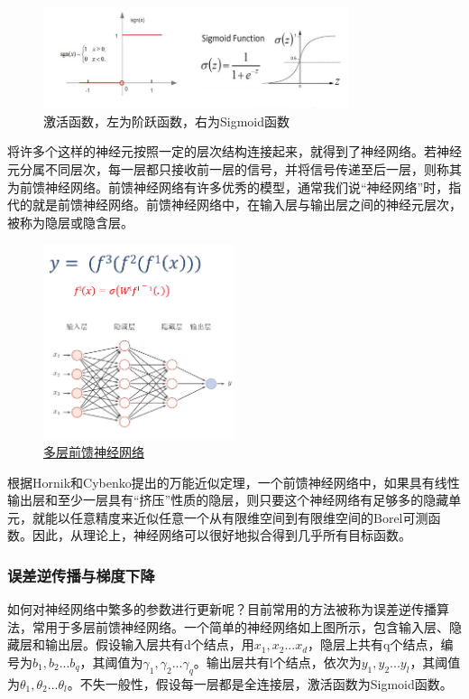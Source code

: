 \documentclass[UTF8,a4paper，12pt]{article}
\theoremstyle{theorem}
\theoremstyle{definition}
\begin{document}
\begin{figure}[htbp]
	\centering
	\includegraphics[width=0.8\textwidth]{assets/05}
	\caption{激活函数，左为阶跃函数，右为Sigmoid函数}
\end{figure}

将许多个这样的神经元按照一定的层次结构连接起来，就得到了神经网络。若神经元分属不同层次，每一层都只接收前一层的信号，并将信号传递至后一层，则称其为前馈神经网络。前馈神经网络有许多优秀的模型，通常我们说“神经网络”时，指代的就是前馈神经网络。前馈神经网络中，在输入层与输出层之间的神经元层次，被称为隐层或隐含层。

\begin{figure}[htbp]
	\centering
	\includegraphics[width=0.5\textwidth]{assets/06}
	\caption{\href{https://nndl.github.io/nndl-book.pdf}{多层前馈神经网络}}
\end{figure}

根据Hornik和Cybenko提出的万能近似定理，一个前馈神经网络中，如果具有线性输出层和至少一层具有“挤压”性质的隐层，则只要这个神经网络有足够多的隐藏单元，就能以任意精度来近似任意一个从有限维空间到有限维空间的Borel可测函数。因此，从理论上，神经网络可以很好地拟合得到几乎所有目标函数。

\subsubsection{误差逆传播与梯度下降}

如何对神经网络中繁多的参数进行更新呢？目前常用的方法被称为误差逆传播算法，常用于多层前馈神经网络。一个简单的神经网络如上图所示，包含输入层、隐藏层和输出层。假设输入层共有d个结点，用$x_1,x_2...x_d$，隐层上共有q个结点，编号为$b_1,b_2...b_q$，其阈值为$\gamma_1,\gamma_2...\gamma_q$。输出层共有l个结点，依次为$y_1,y_2...y_l$，其阈值为$\theta_1,\theta_2...\theta_l$。不失一般性，假设每一层都是全连接层，激活函数为Sigmoid函数。
\end{document}
